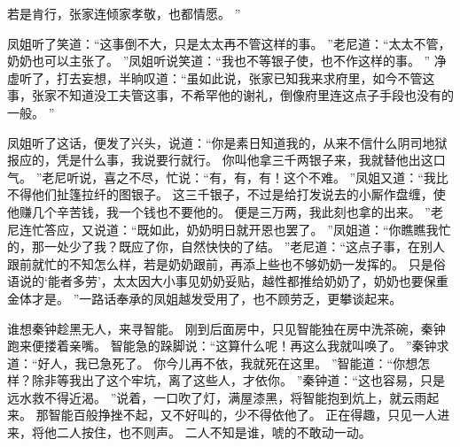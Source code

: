 若是肯行，张家连倾家孝敬，也都情愿。
”\par
凤姐听了笑道：“这事倒不大，只是太太再不管这样的事。
”老尼道：“太太不管，奶奶也可以主张了。
”凤姐听说笑道：“我也不等银子使，也不作这样的事。
”
净虚听了，打去妄想，半晌叹道：“虽如此说，张家已知我来求府里，如今不管这事，张家不知道没工夫管这事，不希罕他的谢礼，倒像府里连这点子手段也没有的一般。
”\par
凤姐听了这话，便发了兴头，说道：“你是素日知道我的，从来不信什么阴司地狱报应的，凭是什么事，我说要行就行。
你叫他拿三千两银子来，我就替他出这口气。
”老尼听说，喜之不尽，忙说：“有，有，有！这个不难。
”凤姐又道：“我比不得他们扯篷拉纤的图银子。
这三千银子，不过是给打发说去的小厮作盘缠，使他赚几个辛苦钱，我一个钱也不要他的。
便是三万两，我此刻也拿的出来。
”老尼连忙答应，又说道：“既如此，奶奶明日就开恩也罢了。
”凤姐道：“你瞧瞧我忙的，那一处少了我？既应了你，自然快快的了结。
”老尼道：“这点子事，在别人跟前就忙的不知怎么样，若是奶奶跟前，再添上些也不够奶奶一发挥的。
只是俗语说的‘能者多劳’，太太因大小事见奶奶妥贴，越性都推给奶奶了，奶奶也要保重金体才是。
”一路话奉承的凤姐越发受用了，也不顾劳乏，更攀谈起来。
\par
{}
谁想秦钟趁黑无人，来寻智能。
刚到后面房中，只见智能独在房中洗茶碗，秦钟跑来便搂着亲嘴。
智能急的跺脚说：“这算什么呢！再这么我就叫唤了。
”秦钟求道：“好人，我已急死了。
你今儿再不依，我就死在这里。
”智能道：“你想怎样？除非等我出了这个牢坑，离了这些人，才依你。
”秦钟道：“这也容易，只是远水救不得近渴。
”说着，一口吹了灯，满屋漆黑，将智能抱到炕上，就云雨起来。
那智能百般挣挫不起，又不好叫的，少不得依他了。
正在得趣，只见一人进来，将他二人按住，也不则声。
二人不知是谁，唬的不敢动一动。
